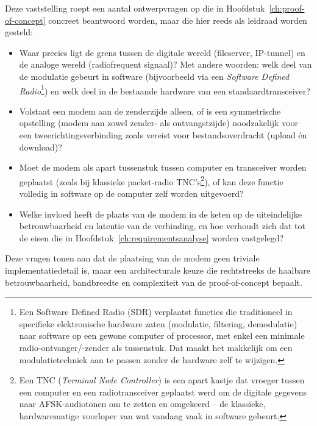 Deze vaststelling roept een aantal ontwerpvragen op die in
Hoofdstuk~\ref{ch:proof-of-concept} concreet beantwoord worden, maar die hier reeds
als leidraad worden gesteld:

\begin{itemize}
  \item Waar precies ligt de grens tussen de digitale wereld (fileserver, IP-tunnel) en
        de analoge wereld (radiofrequent signaal)? Met andere woorden: welk deel van de
        modulatie gebeurt in software (bijvoorbeeld via een \textit{Software Defined
        Radio}\footnote{Een Software Defined Radio (SDR) verplaatst functies die
        traditioneel in specifieke elektronische hardware zaten (modulatie,
        filtering, demodulatie) naar software op een gewone computer of processor,
        met enkel een minimale radio-ontvanger/-zender als tussenstuk. Dat maakt het
        makkelijk om een modulatietechniek aan te passen zonder de hardware zelf te
        wijzigen.}) en welk deel in de bestaande hardware van een standaardtransceiver?
  \item Volstaat een modem aan de zenderzijde alleen, of is een symmetrische opstelling
        (modem aan zowel zender- als ontvangstzijde) noodzakelijk voor een
        tweerichtingsverbinding zoals vereist voor bestandsoverdracht (upload \'{e}n
        download)?
  \item Moet de modem als apart tussenstuk tussen computer en transceiver worden
        geplaatst (zoals bij klassieke packet-radio TNC's\footnote{Een TNC
        (\textit{Terminal Node Controller}) is een apart kastje dat vroeger tussen een
        computer en een radiotransceiver geplaatst werd om de digitale gegevens naar
        AFSK-audiotonen om te zetten en omgekeerd -- de klassieke, hardwarematige
        voorloper van wat vandaag vaak in software gebeurt.}), of kan deze functie
        volledig in software op de computer zelf worden uitgevoerd?
  \item Welke invloed heeft de plaats van de modem in de keten op de uiteindelijke
        betrouwbaarheid en latentie van de verbinding, en hoe verhoudt zich dat tot de
        eisen die in Hoofdstuk~\ref{ch:requirementsanalyse} worden vastgelegd?
\end{itemize}

Deze vragen tonen aan dat de plaatsing van de modem geen triviale implementatiedetail
is, maar een architecturale keuze die rechtstreeks de haalbare betrouwbaarheid,
bandbreedte en complexiteit van de proof-of-concept bepaalt.

